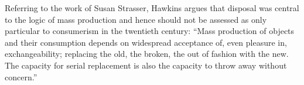 Referring to the work of Susan Strasser, Hawkins argues that disposal was central to the logic of mass production and hence should not be assessed as only particular to consumerism in the twentieth century: “Mass production of objects and their consumption depends on widespread acceptance of, even pleasure in, exchangeability; replacing the old, the broken, the out of fashion with the new. The capacity for serial replacement is also the capacity to throw away without concern.”



